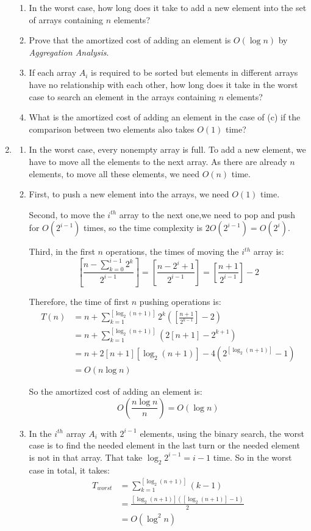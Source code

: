 \documentclass[12pt,a4paper]{article}
\makeatletter
\newtheorem*{solution}{Solution}
\theoremstyle{definition}
\renewenvironment{solution}[1][Solution] {\par\pushQED{\qed}\normalfont\topsep6\p@\@plus6\p@\relax\trivlist\item[\hskip\labelsep\bfseries#1\@addpunct{.}]\ignorespaces}{\popQED\endtrivlist\@endpefalse} \makeatother
\makeatother
\begin{document}
\begin{enumerate}
    \begin{enumerate}
        \item In the worst case, how long does it take to add a new element into the set of arrays containing $n$ elements?
        \item Prove that the amortized cost of adding an element is $O(\log n)$ by \emph{Aggregation Analysis}.
        \item If each array $A_i$ is required to be sorted but elements in different arrays have no relationship with each other, how long does it take in the worst case to search an element in the arrays containing $n$ elements? 
\item What is the amortized cost of adding an element in the case of (c) if the comparison between two elements also takes $O(1)$ time?
    \end{enumerate}
	\begin{solution}

\begin{enumerate}
\item In the worst case, every nonempty array is full. To add a new element, we have to move all the elements to the next array. As there are already $n$ elements, to move all these elements, we need $O(n)$ time. 
\item First, to push a new element into the arrays, we need $O(1)$ time.

 Second, to move the $i^{th}$ array to the next one,we need to pop and push for $O(2^{i-1})$ times, so the time complexity is $2O(2^{i-1}) = O(2^i)$.
 
 Third, in the first $n$ operations, the times of moving the $i^{th}$ array is: 
 $$[\frac{n-\sum^{i-1}_{k=0}2^{k}}{2^{i-1}}] = [\frac{n - 2^i + 1}{2^{i-1}}] = [\frac{n+1}{2^{i-1}}]-2$$
 
 Therefore, the time of first $n$ pushing operations is:
 \begin{align*}
 T(n) &= n+\sum_{k=1}^{[\log_{2} (n+1)]}2^{k}([\frac{n+1}{2^{k-1}}]-2)\\
 &= n+\sum_{k=1}^{[\log_{2} (n+1)]}(2[n+1]-2^{k+1})\\
 &= n+2[n+1][\log_{2} (n+1)]-4(2^{[\log_{2} (n+1)]}-1)\\
 &= O(n\log n) 
 \end{align*}
 
 So the amortized cost of adding an element is: $$O(\frac{n\log n}{n}) = O(\log n)$$

\item In the $i^{th}$ array $A_{i}$ with $2^{i-1}$ elements, using the binary search, the worst case is to find the needed element in the last turn or the needed element is not in that array. That take $\log_{2} 2^{i-1} = i -1$ time. So in the worst case in total, it takes:
\begin{align*}
T_{worst} &=  \sum_{k=1}^{[\log_{2} (n+1)]} (k-1)\\
&= \frac{[\log_{2} (n+1)]([\log_{2} (n+1)]-1)}{2}\\
&= O(\log^2 n)
\end{align*}


\end{enumerate}
\end{solution}
\end{enumerate}
\end{document}

